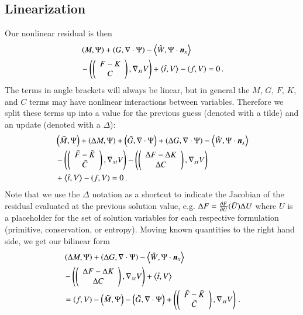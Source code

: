 \documentclass[preprint,12pt]{elsarticle}
\begin{document}
\subsection{Linearization}
Our nonlinear residual is then
\begin{align*}
&\left( M,\Psi \right)+\left( G,\nabla\cdot\Psi \right)-\left\langle \hat W,\Psi\cdot\boldsymbol n_x \right\rangle\\
&-\left( \left( \begin{array}{c} F-K\\ C\\ \end{array} \right),\nabla_{xt} V \right)+\left\langle \hat t,V \right\rangle-\left( f,V \right)=0\,.
\end{align*}
The terms in angle brackets will always be linear, but in general the $M$, $G$, $F$, $K$, and $C$ terms may have nonlinear interactions
between variables.
Therefore we split these terms up into a value for the previous guess (denoted with a tilde) and an update (denoted with a $\Delta$):
\begin{align*}
&\left( \tilde M,\Psi \right) + \left( \Delta M,\Psi \right)
+\left( \tilde G,\nabla\cdot\Psi \right) + \left( \Delta G,\nabla\cdot\Psi \right)
-\left\langle \hat W,\Psi\cdot\boldsymbol n_x \right\rangle\\
&-\left( \left( \begin{array}{c} \tilde F-\tilde K\\ \tilde C\\ \end{array} \right),\nabla_{xt} V \right) - \left( \left( \begin{array}{c} \Delta F-\Delta K\\ \Delta C\\ \end{array} \right),\nabla_{xt} V \right)\\
&+\left\langle \hat t,V \right\rangle-\left( f,V \right)=0\,.
\end{align*}
Note that we use the $\Delta$ notation as a shortcut to indicate the Jacobian of the residual evaluated at the previous solution value, e.g.
$\Delta F=\frac{\partial F}{\partial U}(\tilde U)\Delta U$ where $U$ is a placeholder for the set of solution variables for each respective formulation 
(primitive, conservation, or entropy).
Moving known quantities to the right hand side, we get our bilinear form
\begin{align}
\label{eq:AbstractBilinearForm}
&\left( \Delta M,\Psi \right)
+\left( \Delta G,\nabla\cdot\Psi \right)
-\left\langle \hat W,\Psi\cdot\boldsymbol n_x \right\rangle\\
&-\left( \left( \begin{array}{c} \Delta F-\Delta K\\ \Delta C\\ \end{array} \right),\nabla_{xt} V \right)
+\left\langle \hat t,V \right\rangle\\
&=\left( f,V \right)
-\left( \tilde M,\Psi \right) 
-\left( \tilde G,\nabla\cdot\Psi \right) 
+\left( \left( \begin{array}{c} \tilde F-\tilde K\\ \tilde C\\ \end{array} \right),\nabla_{xt} V \right)\,.
\end{align}
\end{document}
